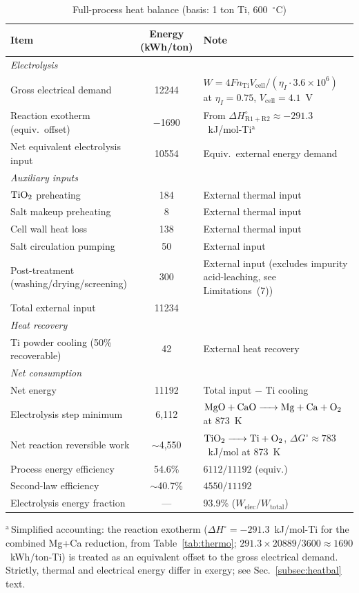 \documentclass[sn-mathphys,Numbered]{sn-jnl}
\begin{document}
\begin{table}[!ht]
\centering
\footnotesize
\caption{Full-process heat balance (basis: 1 ton Ti, 600~$^{\circ}$C)}
\label{tab:heatbal}
\begin{tabularx}{\linewidth}{l c X}
\toprule
Item & Energy (kWh/ton) & Note \\
\midrule
\multicolumn{3}{l}{\textit{Electrolysis}} \\
\quad Gross electrical demand & 12244 & $W = 4F n_{\mathrm{Ti}} V_{\mathrm{cell}}/(\eta_I \cdot 3.6{\times}10^6)$ at $\eta_I=0.75$, $V_{\mathrm{cell}}=4.1$~V \\
\quad Reaction exotherm (equiv.~offset) & $-$1690 & From $\Delta H^{\circ}_{\mathrm{R1{+}R2}} \approx -291.3$~kJ/mol-Ti$^{\mathrm{a}}$ \\
\quad Net equivalent electrolysis input & 10554 & Equiv.~external energy demand \\
\midrule
\multicolumn{3}{l}{\textit{Auxiliary inputs}} \\
\quad $\ce{TiO2}$ preheating & 184 & External thermal input \\
\quad Salt makeup preheating & 8 & External thermal input \\
\quad Cell wall heat loss & 138 & External thermal input \\
\quad Salt circulation pumping & 50 & External input \\
\quad Post-treatment (washing/drying/screening) & 300 & External input (excludes impurity acid-leaching, see Limitations~(7)) \\
\midrule
\quad Total external input & 11234 & \\
\midrule
\multicolumn{3}{l}{\textit{Heat recovery}} \\
\quad Ti powder cooling (50\% recoverable) & 42 & External heat recovery \\
\midrule
\multicolumn{3}{l}{\textit{Net consumption}} \\
\quad Net energy & 11192 & Total input $-$ Ti cooling \\
\quad Electrolysis step minimum & 6{,}112 & $\ce{MgO + CaO -> Mg + Ca + O2}$ at 873~K \\
\quad Net reaction reversible work & $\sim$4{,}550 & $\ce{TiO2 -> Ti + O2}$, $\Delta G^{\circ}\approx783$~kJ/mol at 873~K \\
\quad Process energy efficiency & 54.6\% & $6112/11192$ (equiv.) \\
\quad Second-law efficiency & $\sim$40.7\% & $4550/11192$ \\
\quad Electrolysis energy fraction & --- & 93.9\% ($W_{\mathrm{elec}}/W_{\mathrm{total}}$) \\
\bottomrule
\end{tabularx}

\par\footnotesize $^{\mathrm{a}}$\,Simplified accounting: the reaction exotherm ($\Delta H^{\circ} = -291.3$~kJ/mol-Ti for the combined Mg+Ca reduction, from Table~\ref{tab:thermo}; $291.3 \times 20889 / 3600 \approx 1690$~kWh/ton-Ti) is treated as an equivalent offset to the gross electrical demand. Strictly, thermal and electrical energy differ in exergy; see Sec.~\ref{subsec:heatbal} text.
\end{table}
\end{document}
